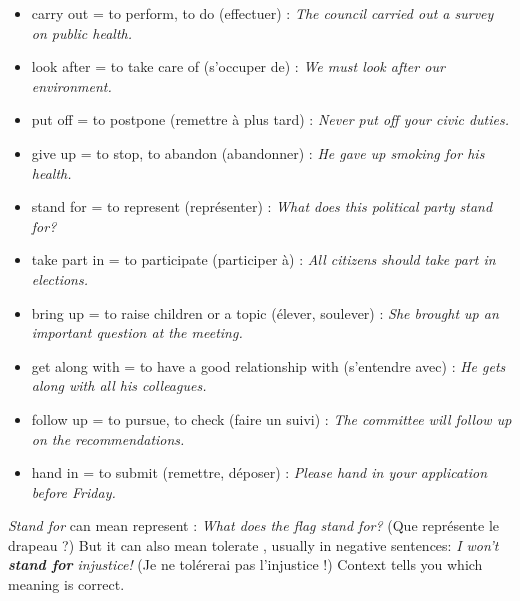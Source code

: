 \documentclass[11pt]{article}
\newcommand{\cle}[1]{{\popxbold\color{popdark}#1}}
\begin{document}
\begin{aretenir}
\begin{itemize}
\item \cle{carry out} = to perform, to do (effectuer) : \emph{The council carried out a survey on public health.}
\item \cle{look after} = to take care of (s'occuper de) : \emph{We must look after our environment.}
\item \cle{put off} = to postpone (remettre \`a plus tard) : \emph{Never put off your civic duties.}
\item \cle{give up} = to stop, to abandon (abandonner) : \emph{He gave up smoking for his health.}
\item \cle{stand for} = to represent (repr\'esenter) : \emph{What does this political party stand for?}
\item \cle{take part in} = to participate (participer \`a) : \emph{All citizens should take part in elections.}
\item \cle{bring up} = to raise children or a topic (\'elever, soulever) : \emph{She brought up an important question at the meeting.}
\item \cle{get along with} = to have a good relationship with (s'entendre avec) : \emph{He gets along with all his colleagues.}
\item \cle{follow up} = to pursue, to check (faire un suivi) : \emph{The committee will follow up on the recommendations.}
\item \cle{hand in} = to submit (remettre, d\'eposer) : \emph{Please hand in your application before Friday.}
\end{itemize}
\end{aretenir}

\begin{savaistu}
\emph{Stand for} can mean \og represent \fg{} : \emph{What does the flag stand for?} (Que repr\'esente le drapeau ?) But it can also mean \og tolerate \fg{}, usually in negative sentences: \emph{I won't \textbf{stand for} injustice!} (Je ne tol\'ererai pas l'injustice !) Context tells you which meaning is correct.
\end{savaistu}
\end{document}
